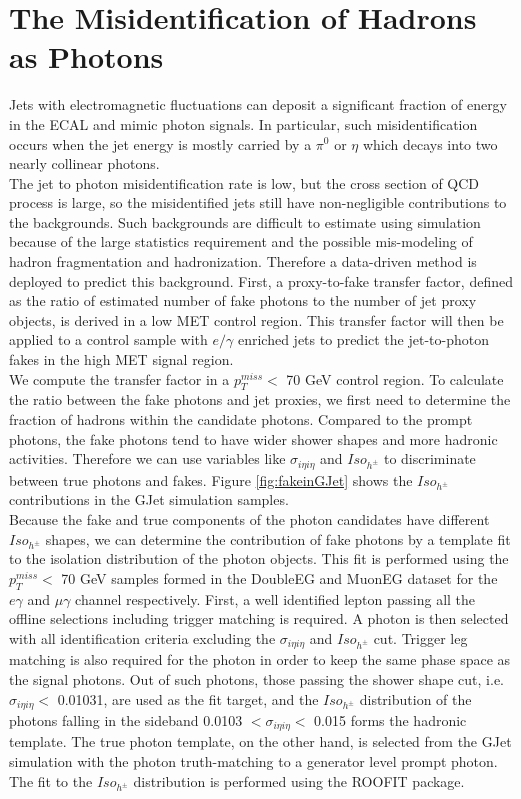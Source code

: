 \documentclass[thesis.tex]{subfiles}
\renewcommand\_{\textunderscore\allowbreak}
\begin{document}
\section{The Misidentification of Hadrons as Photons}\label{subsec:jetfakepho}
Jets with electromagnetic fluctuations can deposit a significant fraction of energy in the ECAL and mimic photon signals. In particular, such misidentification occurs when the jet energy is mostly carried by a $\pi^0$ or $\eta$ which decays into two nearly collinear photons. \\

The jet to photon misidentification rate is low, but the cross section of QCD process is large, so the misidentified jets still have non-negligible contributions to the backgrounds. Such backgrounds are difficult to estimate using simulation because of the large statistics requirement and the possible mis-modeling of hadron fragmentation and hadronization. Therefore a data-driven method is deployed to predict this background. First, a proxy-to-fake transfer factor, defined as the ratio of estimated number of fake photons to the number of jet proxy objects, is derived in a low MET control region. This transfer factor will then be applied to a control sample with $e/\gamma$ enriched jets to predict the jet-to-photon fakes in the high MET signal region. \\

We compute the transfer factor in a $p_T^{miss} < $ 70 GeV control region. To calculate the ratio between the fake photons and jet proxies, we first need to determine the fraction of hadrons within the candidate photons.  Compared to the prompt photons, the fake photons tend to have wider shower shapes and more hadronic activities. Therefore we can use variables like $\sigma_{i\eta i\eta}$ and $Iso_{h^\pm}$ to discriminate between true photons and fakes. Figure \ref{fig:fakeinGJet} shows the $Iso_{h^\pm}$ contributions in the GJet simulation samples. \\

Because the fake and true components of the photon candidates have different $Iso_{h^\pm}$ shapes, we can determine the contribution of fake photons by a template fit to the isolation distribution of the photon objects. This fit is performed using the $p_T^{miss} <$ 70 GeV samples formed in the DoubleEG and MuonEG dataset for the $e\gamma$ and $\mu\gamma$ channel respectively. First, a well identified lepton passing all the offline selections including trigger matching is required. A photon is then selected with all identification criteria excluding the $\sigma_{i\eta i\eta}$ and $Iso_{h^\pm}$ cut. Trigger leg matching is also required for the photon in order to keep the same phase space as the signal photons. Out of such photons, those passing the shower shape cut, i.e. $\sigma_{i\eta i\eta} <$ 0.01031, are used as the fit target, and the $Iso_{h^\pm}$ distribution of the photons falling in the sideband 0.0103 $< \sigma_{i\eta i\eta} <$ 0.015 forms the hadronic template. The true photon template, on the other hand, is selected from the GJet simulation with the photon truth-matching to a generator level prompt photon. The fit to the $Iso_{h^\pm}$ distribution is performed using the ROOFIT package. \\
\end{document}
